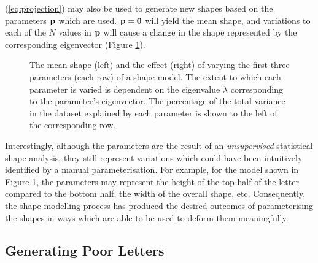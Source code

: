 \documentclass{sig-alternate}
\begin{document}
(\ref{eq:projection}) may also be used
to generate new shapes based on the parameters ${\bf p}$ which are used. ${\bf
p}={\bf 0}$ will yield the mean shape, and variations to each of the $N$ values
in ${\bf p}$ will cause a change in the shape represented by the corresponding
eigenvector (Figure \ref{fig:deviations_sPrint}). 

\begin{figure}[thpb]
\centering
{}
\caption[The mean shape and the effect of varying the first three parameters of
the shape model derived from PCA from the dataset of print `s'
shapes.]{\label{fig:deviations_sPrint}The mean shape (left) and the effect
    (right) of varying the first three parameters (each row) of a shape model.
     The extent to which each
parameter is varied is dependent on the eigenvalue $\lambda$ corresponding to
the parameter's eigenvector. The percentage of the total variance in the dataset
explained by each parameter is shown to the left of the corresponding row. }

\end{figure}

Interestingly, although the parameters are the result of an \emph{unsupervised}
statistical shape analysis, they still represent variations which could have
been intuitively identified by a manual parameterisation. For example, for the
model shown in Figure \ref{fig:deviations_sPrint}, the parameters may represent
the height of the top half of the letter compared to the bottom half, the width
of the overall shape, etc. Consequently, the shape modelling process has
produced the desired outcomes of parameterising the shapes in ways which are
able to be used to deform them meaningfully.


\subsection{Generating Poor Letters}
\end{document}
